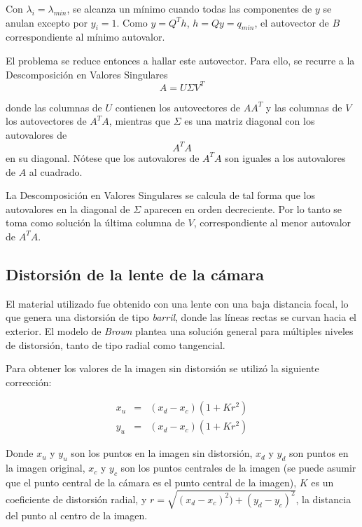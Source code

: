 \documentclass[a4paper,10pt]{article}
\begin{document}
Con $\lambda_{i} = \lambda_{min}$, se alcanza un mínimo cuando todas las componentes de $y$ se anulan excepto por $y_{i} = 1$. Como $y = Q^{T}h$,
$h=Qy = q_{min}$, el autovector de $B$ correspondiente al mínimo autovalor.

El problema se reduce entonces a hallar este autovector. Para ello, se recurre a la Descomposición en Valores Singulares
\begin{equation}
    A = U\Sigma V^{T}
\end{equation}

donde las columnas de $U$ contienen los autovectores de $AA^{T}$ y las columnas de $V$ los autovectores de $A^{T}A$, mientras que $\Sigma$ es una matriz
diagonal con los autovalores de $$A^{T}A$$ en su diagonal. Nótese que los autovalores de $A^{T}A$ son iguales a los autovalores de $A$ al cuadrado.

La Descomposición en Valores Singulares se calcula de tal forma que los autovalores en la diagonal de $\Sigma$ aparecen en orden decreciente. Por lo tanto
se toma como solución la última columna de $V$, correspondiente al menor autovalor de $A^{T}A$.

\subsection{Distorsión de la lente de la cámara}

El material utilizado fue obtenido con una lente con una baja distancia focal,
lo que genera una distorsión de tipo \textit{barril}, donde las líneas rectas
se curvan hacia el exterior. El modelo de \textit{Brown} plantea una solución
general para múltiples niveles de distorsión, tanto de tipo radial como
tangencial.

Para obtener los valores de la imagen sin distorsión se utilizó la siguiente
corrección:

\begin{eqnarray*}
    x_u &=& (x_d - x_c) (1+K r^2) \\
    y_u &=& (x_d - x_c) (1+K r^2)
\end{eqnarray*}

Donde $x_u$ y $y_u$ son los puntos en la imagen sin distorsión, $x_d$ y $y_d$ son
puntos en la imagen original, $x_c$ y $y_c$ son los puntos centrales de la
imagen (se puede asumir que el punto central de la cámara es el punto central
de la imagen), $K$ es un coeficiente de distorsión radial, y $r =
\sqrt{(x_d-x_c)^2) + (y_d-y_c)^2}$, la distancia del punto al centro de la
imagen.
\end{document}
